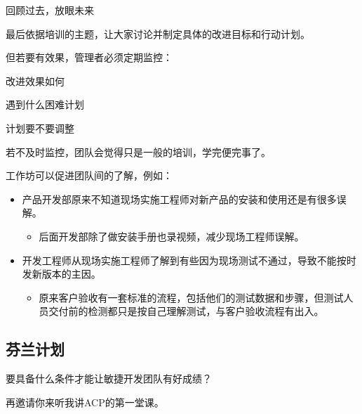 \begin{description}
\tightlist
\item[]
回顾过去，放眼未来
\end{description}

最后依据培训的主题，让大家讨论并制定具体的改进目标和行动计划。

但若要有效果，管理者必须定期监控：

\begin{description}
\tightlist
\item[]
改进效果如何

遇到什么困难计划

计划要不要调整
\end{description}

若不及时监控，团队会觉得只是一般的培训，学完便完事了。

工作坊可以促进团队间的了解，例如：

\begin{itemize}
\tightlist
\item
  产品开发部原来不知道现场实施工程师对新产品的安装和使用还是有很多误解。

  \begin{itemize}
  \tightlist
  \item
    后面开发部除了做安装手册也录视频，减少现场工程师误解。
  \end{itemize}
\item
  开发工程师从现场实施工程师了解到有些因为现场测试不通过，导致不能按时发新版本的主因。

  \begin{itemize}
  \tightlist
  \item
    原来客户验收有一套标准的流程，包括他们的测试数据和步骤，但测试人员交付前的检测都只是按自己理解测试，与客户验收流程有出入。
  \end{itemize}
\end{itemize}

\hypertarget{ux82acux5170ux8ba1ux5212}{%
\subsection{芬兰计划}\label{ux82acux5170ux8ba1ux5212}}

要具备什么条件才能让敏捷开发团队有好成绩？

再邀请你来听我讲ACP的第一堂课。

\begin{description}
\item[]
\end{description}

